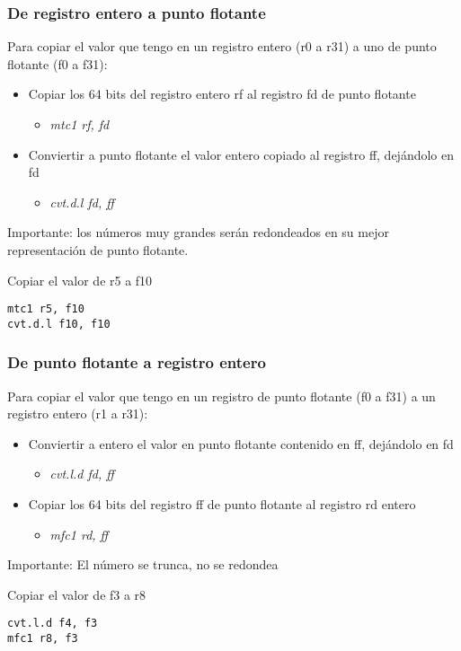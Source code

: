 \documentclass{beamer}
\begin{document}
\begin{frame}[fragile]
\frametitle{De registro entero a punto flotante}
Para copiar el valor que tengo en un registro entero (r0 a r31) a uno de punto flotante (f0 a f31):
\begin{itemize}
\item Copiar los 64 bits del registro entero rf al registro fd de punto flotante
\begin{itemize}
\item \emph{mtc1 rf, fd}
\end{itemize}

\item Conviertir a punto flotante el valor entero copiado al registro ff, dejándolo en fd
\begin{itemize}
\item \emph{cvt.d.l fd, ff}
\end{itemize}

\end{itemize}

Importante: los números muy grandes serán redondeados en su mejor representación de punto flotante.

\begin{block}{Copiar el valor de r5 a f10}
\begin{lstlisting}[language=WinMIPS64,basicstyle=\ttfamily,keywordstyle=\color{blue}]
mtc1 r5, f10
cvt.d.l f10, f10
\end{lstlisting}
\end{block}

\end{frame}

\begin{frame}[fragile]
\frametitle{De punto flotante a registro entero}
Para copiar el valor que tengo en un registro de punto flotante (f0 a f31) a un registro entero (r1 a r31):
\begin{itemize}
\item Conviertir a entero el valor en punto flotante contenido en ff, dejándolo en fd
\begin{itemize}
\item \emph{cvt.l.d fd, ff}
\end{itemize}
\item Copiar los 64 bits del registro ff de punto flotante al registro rd entero
\begin{itemize}
\item \emph{mfc1 rd, ff}
\end{itemize}
\end{itemize}

Importante: El número se trunca, no se redondea
\begin{block}{Copiar el valor de f3 a r8}
\begin{lstlisting}[language=WinMIPS64,basicstyle=\ttfamily,keywordstyle=\color{blue}]
cvt.l.d f4, f3
mfc1 r8, f3
\end{lstlisting}
\end{block}

\end{frame}
\end{document}
